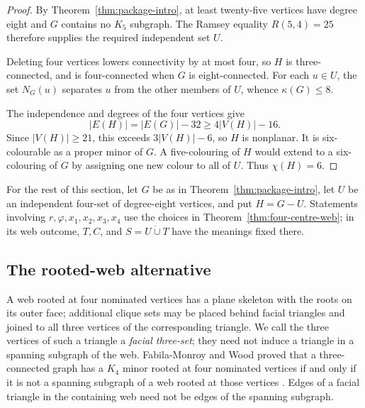 \documentclass[11pt]{amsart}
\begin{document}
\begin{proof}
By Theorem~\ref{thm:package-intro}, at least twenty-five vertices have
degree eight and $G$ contains no $K_5$ subgraph.  The Ramsey equality
$R(5,4)=25$ therefore supplies the required independent set $U$.

Deleting four vertices lowers connectivity by at most four, so $H$ is
three-connected, and is four-connected when $G$ is eight-connected.  For
each $u\in U$, the set $N_G(u)$ separates $u$ from the other members of
$U$, whence $\kappa(G)\leq8$.

The independence and degrees of the four vertices give
\[
 |E(H)|=|E(G)|-32\geq4|V(H)|-16.
\]
Since $|V(H)|\geq21$, this exceeds $3|V(H)|-6$, so $H$ is nonplanar.
It is six-colourable as a proper minor of $G$.  A five-colouring of $H$
would extend to a six-colouring of $G$ by assigning one new colour to all
of $U$.  Thus $\chi(H)=6$.
\end{proof}

For the rest of this section, let $G$ be as in
Theorem~\ref{thm:package-intro}, let $U$ be an independent four-set of
degree-eight vertices, and put $H=G-U$.  Statements involving
$r,\varphi,x_1,x_2,x_3,x_4$ use the choices in
Theorem~\ref{thm:four-centre-web}; in its web outcome, $T,C$, and
$S=U\mathbin{\dot\cup}T$ have the meanings fixed there.

\subsection{The rooted-web alternative}

A web
rooted at four nominated vertices has a plane skeleton with the roots on
its outer face; additional clique sets may be placed behind facial
triangles and joined to all three vertices of the corresponding triangle.
We call the three vertices of such a triangle a \emph{facial three-set};
they need not induce a triangle in a spanning subgraph of the web.
Fabila-Monroy and Wood proved that a three-connected graph has a $K_4$
minor rooted at four nominated vertices if and only if it is not a spanning
subgraph of a web rooted at those vertices
\cite[Theorem~8]{FabilaMonroyWood2013}.  Edges of a facial triangle in the
containing web need not be edges of the spanning subgraph.
\end{document}
